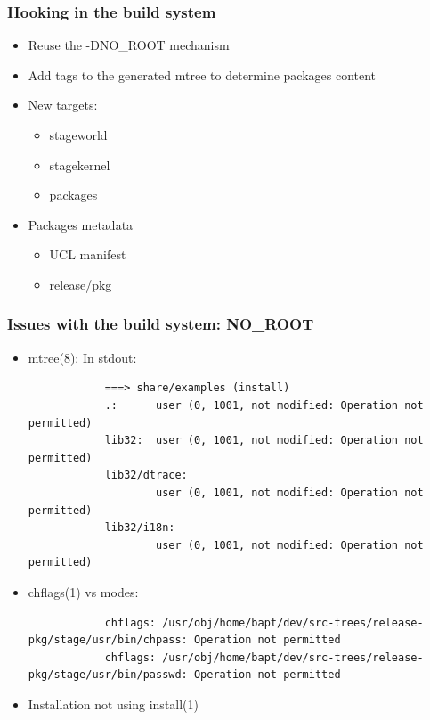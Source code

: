 \begin{frame}
	\frametitle{Hooking in the build system}
	\begin{itemize}
		\item Reuse the -DNO\_ROOT mechanism
		\item Add tags to the generated mtree to determine packages content
		\item New targets:
			\begin{itemize}
				\item stageworld
				\item stagekernel
				\item packages
			\end{itemize}
		\item Packages metadata
			\begin{itemize}
				\item UCL manifest
				\item release/pkg
			\end{itemize}
	\end{itemize}
\end{frame}

\begin{frame}[fragile]
	\frametitle{Issues with the build system: NO\_ROOT}
	\begin{itemize}
		\item mtree(8):
			In \underline{stdout}:
			\begin{lstlisting}
			===> share/examples (install)
			.:      user (0, 1001, not modified: Operation not permitted)
			lib32:  user (0, 1001, not modified: Operation not permitted)
			lib32/dtrace: 
			        user (0, 1001, not modified: Operation not permitted)
			lib32/i18n: 
			        user (0, 1001, not modified: Operation not permitted)
			\end{lstlisting}
		\item chflags(1) vs modes:
			\begin{lstlisting}
			chflags: /usr/obj/home/bapt/dev/src-trees/release-pkg/stage/usr/bin/chpass: Operation not permitted
			chflags: /usr/obj/home/bapt/dev/src-trees/release-pkg/stage/usr/bin/passwd: Operation not permitted
			\end{lstlisting}

		\item Installation not using install(1)
	\end{itemize}
\end{frame}

